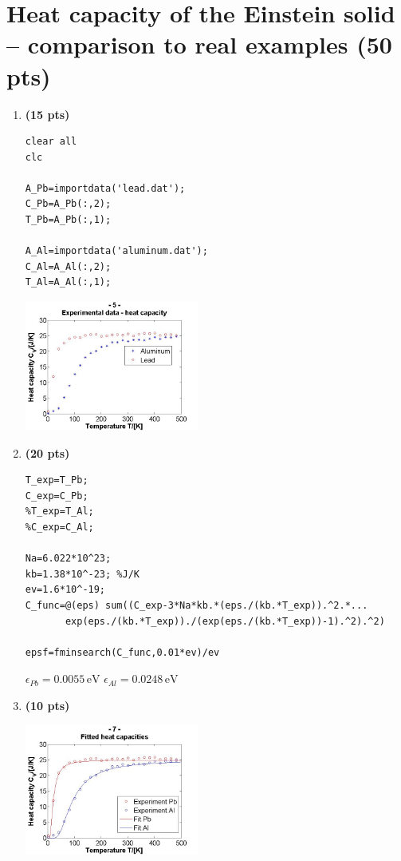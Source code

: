 \documentclass[11pt]{article}
\begin{document}
\section*{Heat capacity of the Einstein solid  -- comparison to real examples (50 pts)}
\label{sec:lot}

\begin{enumerate}[resume]


\item \textbf{(15 pts)} 

\begin{verbatim}
clear all
clc

A_Pb=importdata('lead.dat');
C_Pb=A_Pb(:,2);
T_Pb=A_Pb(:,1);

A_Al=importdata('aluminum.dat');
C_Al=A_Al(:,2);
T_Al=A_Al(:,1);
\end{verbatim}

\includegraphics[width=0.45\textwidth]{P5.jpg}\\

\item \textbf{(20 pts)} 

\begin{verbatim}
T_exp=T_Pb;
C_exp=C_Pb;
%T_exp=T_Al;
%C_exp=C_Al;

Na=6.022*10^23;
kb=1.38*10^-23; %J/K
ev=1.6*10^-19;
C_func=@(eps) sum((C_exp-3*Na*kb.*(eps./(kb.*T_exp)).^2.*...
       exp(eps./(kb.*T_exp))./(exp(eps./(kb.*T_exp))-1).^2).^2)

epsf=fminsearch(C_func,0.01*ev)/ev
\end{verbatim}

$\epsilon_{Pb}=0{.}0055\,\mathrm{eV}$ 
$\epsilon_{Al}=0{.}0248\,\mathrm{eV}$ 


\item \textbf{(10 pts)} 

\includegraphics[width=0.45\textwidth]{P7.jpg}\\


\end{enumerate}
\end{document}
